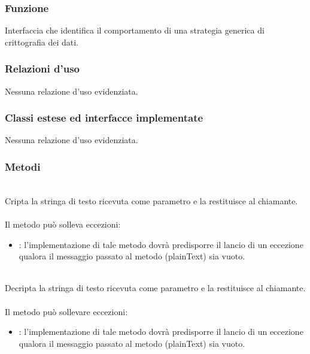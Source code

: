 
\subsubsection*{Funzione}
Interfaccia che identifica il comportamento di una strategia generica di crittografia dei dati.

\subsubsection*{Relazioni d'uso}
Nessuna relazione d'uso evidenziata.

\subsubsection*{Classi estese ed interfacce implementate}

Nessuna relazione d'uso evidenziata.

\subsubsection*{Metodi}
\begin{description}
	\item{}\\
	Cripta la stringa di testo ricevuta come parametro e la restituisce al chiamante.\\\\
	Il metodo può solleva eccezioni:
	\begin{itemize}
		\item {}: l'implementazione di tale metodo dovrà predisporre il lancio di un eccezione qualora il messaggio passato al metodo (plainText) sia vuoto.
	\end{itemize}
	\item{}\\
	Decripta la stringa di testo ricevuta come parametro e la restituisce al chiamante.\\\\
	Il metodo può sollevare eccezioni:
	\begin{itemize}
		\item {}: l'implementazione di tale metodo dovrà predisporre il lancio di un eccezione qualora il messaggio passato al metodo (plainText) sia vuoto.
	\end{itemize}
\end{description}

